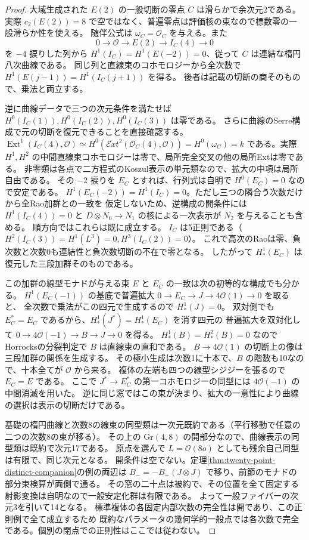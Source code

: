 \begin{proof}
大域生成された $E(2)$ の一般切断の零点 $C$ は滑らかで余次元2である。
実際 $c_2(E(2))=8$ で空ではなく、普遍零点は評価核の束なので標数零の一般滑らか性を使える。
随伴公式は $\omega_C=\mathcal O_C$ を与える。また
\[
 0\to\mathcal O\to E(2)\to I_C(4)\to0
\]
を $-4$ 捩りした列から $H^1(I_C)=H^1(E(-2))=0$、従って $C$ は連結な楕円八次曲線である。
同じ列と直線束のコホモロジーから全次数で $H^1(E(j-1))=H^1(I_C(j+1))$ を得る。
後者は記載の切断の商そのもので、乗法と両立する。

逆に曲線データで三つの次元条件を満たせば $H^0(I_C(1)),H^0(I_C(2)),H^0(I_C(3))$ は零である。
さらに曲線のSerre構成で元の切断を復元できることを直接確認する。
$\operatorname{Ext}^1(I_C(4),\mathcal O)\simeq
H^0(\mathcal Ext^2(\mathcal O_C(4),\mathcal O))=H^0(\omega_C)=k$
である。実際 $H^1,H^2$ の中間直線束コホモロジーは零で、局所完全交叉の他の局所Extは零である。
非零類は各点で二方程式のKoszul表示の単元類なので、拡大の中項は局所自由である。
その $-2$ 捩りを $E_C$ とすれば、行列式は自明で $H^0(E_C)=0$ なので安定である。
$H^1(E_C(-2))=H^1(I_C)=0$。ただし三つの隣合う次数だけから全Rao加群との一致を
仮定しないため、逆構成の開条件には $H^1(I_C(4))=0$ と
$D\otimes N_0\to N_1$ の核による一次表示が $N_2$ を与えることも含める。
順方向ではこれらは既に成立する。
$I_C$ は5正則である（$H^2(I_C(3))=H^1(L^3)=0, H^3(I_C(2))=0$）。
これで高次のRaoは零、負次数と次数0も連結性と負次数切断の不在で零となる。
したがって $H^1_*(E_C)$ は復元した三段加群そのものである。

この加群の線型モナドが与える束 $E$ と $E_C$ の一致は次の初等的な構成でも分かる。
$H^1(E_C(-1))$ の基底で普遍拡大 $0\to E_C\to J\to4\mathcal O(1)\to0$ を取ると、
全次数で乗法がこの四元で生成するので $H^1_*(J)=0$。
双対側でも $E_C^*=E_C$ であるから、$H^1_*(J^*)=H^1_*(E_C)$ を消す四元の
普遍拡大を双対化して $0\to4\mathcal O(-1)\to B\to J\to0$ を得る。
$H^1_*(B)=H^2_*(B)=0$ なのでHorrocksの分裂判定で $B$ は直線束の直和である。
$B\to4\mathcal O(1)$ の切断上の像は三段加群の関係を生成する。
その極小生成は次数1に十本で、$B$ の階数も10なので、十本全てが $\mathcal O$ から来る。
複体の左端も四つの線型シジジーを張るので $E_C=E$ である。
ここで $J^*\to E_C^*$ の第一コホモロジーの同型には $4\mathcal O(-1)$ の中間消滅を用いた。
逆に同じ窓ではこの束が決まり、拡大の一意性により曲線の選択は表示の切断だけである。

基礎の楕円曲線と次数8の線束の同型類は一次元既約である（平行移動で任意の二つの次数8の束が移る）。
その上の $\mathrm{Gr}(4,8)$ の開部分なので、曲線表示の同型類は既約で次元17である。
原点を選んで $L=\mathcal O(8o)$ としても残余自己同型は有限で、同じ次元となる。
開条件は空でない。定理\ref{thm:twenty-point-distinct-companion}の例の両辺は
$B_-=-B_+(J\otimes J)$ で移り、前節のモナドの部分束検算が両側で通る。
その窓の二十点は被約で、その位置を全て固定する射影変換は自明なので一般安定化群は有限である。
よって一般ファイバーの次元3を引いて14となる。
標準複体の各固定内部次数の完全性は開であり、この正則例で全て成立するため
既約なパラメータの幾何学的一般点では各次数で完全である。個別の閉点での正則性はここでは従わない。
\end{proof}
